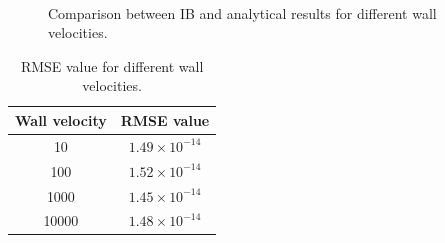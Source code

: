\begin{figure}[H]
    \centering
    \quad
    \\
    \quad
    \caption{Comparison between IB and analytical results for different wall velocities.}
    \label{fig:C3_indirectForcing_wallVelocity}
\end{figure}
%
%
\begin{table}[H]
\centering
\begin{tabular}{c | c}
     Wall velocity & RMSE value \\ \hline \hline
     10 & $1.49 \times 10^{-14}$ \\ \hline
     100 & $1.52 \times 10^{-14}$ \\ \hline
     1000 & $1.45 \times 10^{-14}$ \\ \hline
     10000 & $1.48 \times 10^{-14}$

\end{tabular}
\caption{RMSE value for different wall velocities.}
\label{table:C3_indirectForcing_wallVelocityRSME}
\end{table}
